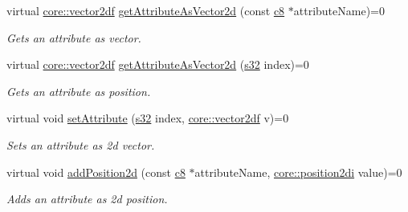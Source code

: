 \begin{DoxyCompactItemize}
virtual \hyperlink{namespaceirr_1_1core_a2cf08556d77f6f5a792973a6e27ed11b}{core\+::vector2df} \hyperlink{classirr_1_1io_1_1IAttributes_a047461734c2eb9e3f1b68a4278a0d24b}{get\+Attribute\+As\+Vector2d} (const \hyperlink{namespaceirr_a9395eaea339bcb546b319e9c96bf7410}{c8} $\ast$attribute\+Name)=0
\begin{DoxyCompactList}\small\item\em Gets an attribute as vector. \end{DoxyCompactList}\item 
virtual \hyperlink{namespaceirr_1_1core_a2cf08556d77f6f5a792973a6e27ed11b}{core\+::vector2df} \hyperlink{classirr_1_1io_1_1IAttributes_a81fb2a12345e49b12cd6cf05968544f5}{get\+Attribute\+As\+Vector2d} (\hyperlink{namespaceirr_ac66849b7a6ed16e30ebede579f9b47c6}{s32} index)=0
\begin{DoxyCompactList}\small\item\em Gets an attribute as position. \end{DoxyCompactList}\item 
\mbox{\label{classirr_1_1io_1_1IAttributes_a10fd4234098fbdbc53c1a2e32fb370f2}} 
virtual void \hyperlink{classirr_1_1io_1_1IAttributes_a10fd4234098fbdbc53c1a2e32fb370f2}{set\+Attribute} (\hyperlink{namespaceirr_ac66849b7a6ed16e30ebede579f9b47c6}{s32} index, \hyperlink{namespaceirr_1_1core_a2cf08556d77f6f5a792973a6e27ed11b}{core\+::vector2df} v)=0
\begin{DoxyCompactList}\small\item\em Sets an attribute as 2d vector. \end{DoxyCompactList}\item 
\mbox{\label{classirr_1_1io_1_1IAttributes_ae875ea8d21955b4945b3d2d4f6e739fe}} 
virtual void \hyperlink{classirr_1_1io_1_1IAttributes_ae875ea8d21955b4945b3d2d4f6e739fe}{add\+Position2d} (const \hyperlink{namespaceirr_a9395eaea339bcb546b319e9c96bf7410}{c8} $\ast$attribute\+Name, \hyperlink{namespaceirr_1_1core_a3643c2cc7820dd78cd87e73a46b92145}{core\+::position2di} value)=0
\begin{DoxyCompactList}\small\item\em Adds an attribute as 2d position. \end{DoxyCompactList}\item 
\mbox{\label{classirr_1_1io_1_1IAttributes_abd4c30bfab5a3755682b9fc902b04310}} 

\end{DoxyCompactItemize}
